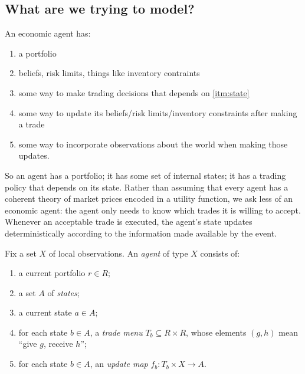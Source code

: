 \documentclass[11pt, one side, article]{memoir}
\theoremstyle{definition}
\theoremstyle{plain}
\newenvironment{definition}
  {\pushQED{\qed}\renewcommand{\qedsymbol}{$\lozenge$}\definitionx}
  {\popQED\enddefinitionx}
\newcommand{\0}{\textsf{0}}
\newcommand{\1}{\tn{\textsf{1}}}
\begin{document}
\subsection*{What are we trying to model?}

\noindent An economic agent has: 
\begin{enumerate}
	\item a portfolio
	\item \label{itm:state} beliefs, risk limits, things like inventory contraints
	\item some way to make trading decisions that depends on \ref{itm:state}
	\item some way to update its beliefs/risk limits/inventory constraints after making a trade
	\item some way to incorporate observations about the world when making those updates.
\end{enumerate}

So an agent has a portfolio; it has some set of internal states; it has a trading policy that depends on its state. Rather than assuming that every agent has a coherent theory of market prices encoded in a utility function, we ask less of an economic agent: the agent only needs to know which trades it is willing to accept. Whenever an acceptable trade is executed, the agent's state updates deterministically according to the information made available by the event.

\begin{definition} \label{def-of-agent}
Fix a set $X$ of local observations.  An \emph{agent} of type $X$ consists of:
\begin{enumerate}[nosep]
\item a current portfolio $r\in R$;
\item a set $A$ of \emph{states};
\item a current state $a\in A$;
\item for each state $b \in A$, a \emph{trade menu} $T_b \subseteq R \times R$, whose elements $(g,h)$ mean ``give $g$, receive $h$'';
\item for each state $b \in A$, an \emph{update map} $f_b \colon T_b \times X \to A$.
\end{enumerate}
\end{definition}
\end{document}
